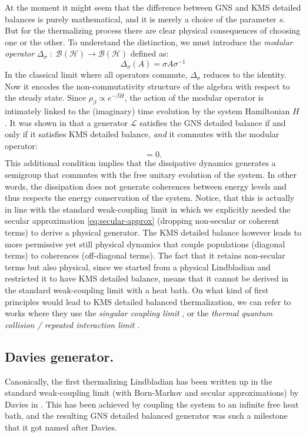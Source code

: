 At the moment it might seem that the difference between GNS and KMS detailed balances is purely mathematical, and it is merely a choice of the parameter $s$. But for the thermalizing process there are clear physical consequences of choosing one or the other. To understand the distinction, we must introduce the \textit{modular operator} $\Delta_\sigma\;:\;\mathcal{B(H)} \rightarrow \mathcal{B(H)}$ defined as:
\begin{equation}
    \Delta_\sigma(A) = \sigma A \sigma^{-1}
\end{equation}
In the classical limit where all operators commute, $\Delta_\sigma$ reduces to the identity. Now it encodes the non-commutativity structure of the algebra with respect to the steady state. Since $\rho_\beta \propto e^{-\beta H}$, the action of the modular operator is intimately linked to the (imaginary) time evolution by the system Hamiltonian $H$. It was shown in \cite{alicki1976detailed} that a generator $\mathcal{L}$ satisfies the GNS detailed balance if and only if it satisfies KMS detailed balance, \textit{and} it commutes with the modular operator:
\begin{equation}
    [\mathcal{L}, \Delta_\sigma] = 0.
\end{equation}
This additional condition implies that the dissipative dynamics generates a semigroup that commutes with the free unitary evolution of the system. In other words, the dissipation does not generate coherences between energy levels and thus respects the energy conservation of the system. Notice, that this is actually in line with the standard weak-coupling limit in which we explicitly needed the secular approximation \eqref{eq:secular-approx} (dropping non-secular or coherent terms) to derive a physical generator. The KMS detailed balance however leads to more permissive yet still physical dynamics that couple populations (diagonal terms) to coherences (off-diagonal terms). The fact that it retains non-secular terms but also physical, since we started from a physical Lindbladian and restricted it to have KMS detailed balance, means that it cannot be derived in the standard weak-coupling limit with a heat bath. On what kind of first principles would lead to KMS detailed balanced thermalization, we can refer to works where they use the \textit{singular coupling limit} \cite{alicki2007quantum}, or the \textit{thermal quantum collision / repeated interaction limit} \cite{attal2007langevin}.

\smallskip
\label{subsec:davies}
\subsection{Davies generator.} Canonically, the first thermalizing Lindbladian has been written up in the standard weak-coupling limit (with Born-Markov and secular approximations) by Davies in \cite{davies1974markovian}. This has been achieved by coupling the system to an infinite free heat bath, and the resulting GNS detailed balanced generator was such a milestone that it got named after Davies.


